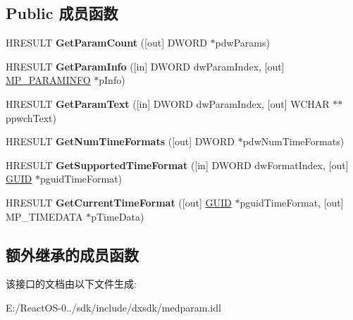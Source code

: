 \subsection*{Public 成员函数}
\begin{DoxyCompactItemize}
\item 
\mbox{\label{interface_i_media_param_info_a6549d29573fb9506ea56bbf939e2a344}} 
H\+R\+E\+S\+U\+LT {\bfseries Get\+Param\+Count} (\mbox{[}out\mbox{]} D\+W\+O\+RD $\ast$pdw\+Params)
\item 
\mbox{\label{interface_i_media_param_info_a2958e57ca9af40cb76831c29a9b5d3a1}} 
H\+R\+E\+S\+U\+LT {\bfseries Get\+Param\+Info} (\mbox{[}in\mbox{]} D\+W\+O\+RD dw\+Param\+Index, \mbox{[}out\mbox{]} \hyperlink{struct___m_p___p_a_r_a_m_i_n_f_o}{M\+P\+\_\+\+P\+A\+R\+A\+M\+I\+N\+FO} $\ast$p\+Info)
\item 
\mbox{\label{interface_i_media_param_info_ab73103fc2d59f6d89291f84d60726712}} 
H\+R\+E\+S\+U\+LT {\bfseries Get\+Param\+Text} (\mbox{[}in\mbox{]} D\+W\+O\+RD dw\+Param\+Index, \mbox{[}out\mbox{]} W\+C\+H\+AR $\ast$$\ast$ppwch\+Text)
\item 
\mbox{\label{interface_i_media_param_info_a8b0a966e867bf31d03c240dc2a121f9f}} 
H\+R\+E\+S\+U\+LT {\bfseries Get\+Num\+Time\+Formats} (\mbox{[}out\mbox{]} D\+W\+O\+RD $\ast$pdw\+Num\+Time\+Formats)
\item 
\mbox{\label{interface_i_media_param_info_afee7b6b6ab47bcfc81cc2e59197f1fd1}} 
H\+R\+E\+S\+U\+LT {\bfseries Get\+Supported\+Time\+Format} (\mbox{[}in\mbox{]} D\+W\+O\+RD dw\+Format\+Index, \mbox{[}out\mbox{]} \hyperlink{interface_g_u_i_d}{G\+U\+ID} $\ast$pguid\+Time\+Format)
\item 
\mbox{\label{interface_i_media_param_info_a3362815f70e0eb5817fc92eed7ca5059}} 
H\+R\+E\+S\+U\+LT {\bfseries Get\+Current\+Time\+Format} (\mbox{[}out\mbox{]} \hyperlink{interface_g_u_i_d}{G\+U\+ID} $\ast$pguid\+Time\+Format, \mbox{[}out\mbox{]} M\+P\+\_\+\+T\+I\+M\+E\+D\+A\+TA $\ast$p\+Time\+Data)
\end{DoxyCompactItemize}
\subsection*{额外继承的成员函数}


该接口的文档由以下文件生成\+:\begin{DoxyCompactItemize}
\item 
E\+:/\+React\+O\+S-\/0../sdk/include/dxsdk/medparam.\+idl\end{DoxyCompactItemize}
